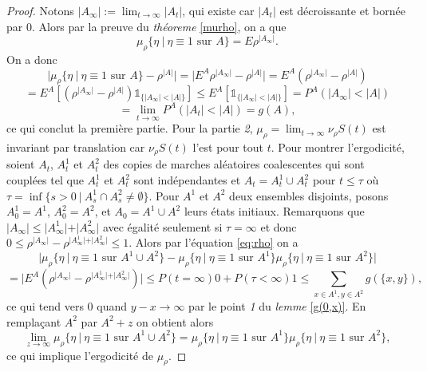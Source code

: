 \documentclass[a4paper,11pt]{article}
\theoremstyle{break}
\theoremstyle{break}
\theoremstyle{definition}
\theoremstyle{remark}
\begin{document}
\begin{proof}
Notons $\vert A_\infty \vert :=\lim_{t\rightarrow\infty} \vert A_t \vert$, qui existe car $\vert A_t \vert$ est décroissante et bornée par $0$. Alors par la preuve du \textit{théoreme} \ref{murho}, on a que
\begin{equation}\label{eq:rho}
\mu_\rho \{ \eta \ \vert \ \eta \equiv 1 \text{ sur }A\} =E\rho^{\vert A_\infty\vert}.
\end{equation}
On a donc
$$
\vert \mu_\rho \{\eta \ \vert \ \eta \equiv 1 \text{ sur } A\} - \rho^{\vert A\vert}\vert=\vert E^A\rho^{\vert A_\infty\vert}-\rho^{\vert A\vert}\vert=E^A(\rho^{\vert A_\infty\vert}-\rho^{\vert A\vert})
$$
$$
=E^A[(\rho^{\vert A_\infty\vert}-\rho^{\vert A\vert})\mathds{1}_{\{\vert A_\infty\vert<\vert A\vert\} }]\leq E^A[\mathds{1}_{\{\vert A_\infty\vert<\vert A\vert\} }] =P^A (\vert A_\infty\vert<\vert A\vert)
$$
$$
=\lim_{t\rightarrow\infty}P^A (\vert A_t\vert<\vert A\vert) = g(A),
$$
ce qui conclut la première partie. 
Pour la partie \textit{2}, $\mu_\rho=\lim_{t\rightarrow\infty} \nu_\rho S(t)$ est invariant par translation car $\nu_\rho S(t)$ l'est pour tout $t$. Pour montrer l'ergodicité, soient $A_t$, $A_t^1$ et $A_t^2$ des copies de marches aléatoires coalescentes qui sont couplées tel que $A_t^1$ et $A_t^2$ sont indépendantes et $A_t=A_t^1\cup A_t^2$ pour $t\leq\tau$ où $\tau=\inf\{s>0 \ \vert \ A_s^1\cap A_s^2 \neq \emptyset\}$. Pour $A^1$ et $A^2$ deux ensembles disjoints, posons $A_0^1=A^1$, $A_0^2=A^2$, et $A_0=A^1\cup A^2$ leurs états initiaux. Remarquons que $\vert A_\infty\vert \leq\vert A^1_\infty\vert +\vert A^2_\infty\vert$ avec égalité seulement si  $\tau=\infty$ et donc $0\leq\rho^{\vert A_\infty\vert}-\rho^{\vert A_\infty^1\vert +\vert A_\infty^2\vert}\leq 1$. Alors par l'équation \eqref{eq:rho} on a
$$
\vert\mu_\rho \{\eta \ \vert \ \eta\equiv 1 \text{ sur } A^1\cup A^2\} - \mu_\rho \{\eta \ \vert \ \eta\equiv 1 \text{ sur } A^1\}\mu_\rho \{\eta \ \vert \ \eta\equiv 1 \text{ sur } A^2\}\vert
$$
$$
=\vert E^A(\rho^{\vert A_\infty\vert}-\rho^{\vert A_\infty^1\vert +\vert A_\infty^2\vert})\vert\leq P(t= \infty) 0+  P(\tau < \infty) 1\leq\sum\limits_{x\in A^1, y\in A^2}g(\{x,y\}),
$$
ce qui tend vers $0$ quand $y-x\rightarrow\infty$ par le point \textit{1} du \textit{lemme} \ref{g(0,x)}. En remplaçant $A^2$ par $A^2 + z$ on obtient alors
$$
\lim_{z\rightarrow\infty}\mu_\rho \{\eta \ \vert \ \eta\equiv 1 \text{ sur } A^1\cup A^2\} = \mu_\rho \{\eta \ \vert \ \eta\equiv 1 \text{ sur } A^1\}\mu_\rho \{\eta \ \vert \ \eta\equiv 1 \text{ sur } A^2\},
$$
ce qui implique l'ergodicité de $\mu_\rho$.

\end{proof}
\end{document}
